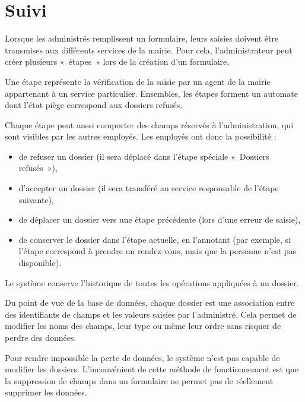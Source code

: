 \section{Suivi}\label{sec:suivi}

Lorsque les administrés remplissent un formulaire, leurs saisies doivent être transmises aux différents services de la mairie.
Pour cela, l'administrateur peut créer plusieurs «~étapes~» lors de la création d'un formulaire.

Une étape représente la vérification de la saisie par un agent de la mairie appartenant à un service particulier.
Ensembles, les étapes forment un automate dont l'état piège correspond aux dossiers refusés.

Chaque étape peut aussi comporter des champs réservés à l'administration, qui sont visibles par les autres employés.
Les employés ont donc la possibilité :
\begin{itemize}
	\item de refuser un dossier (il sera déplacé dans l'étape spéciale «~Dossiers refusés~»),
	\item d'accepter un dossier (il sera transféré au service responsable de l'étape suivante),
	\item de déplacer un dossier vers une étape précédente (lors d'une erreur de saisie),
	\item de conserver le dossier dans l'étape actuelle, en l'annotant (par exemple, si l'étape correspond à prendre un rendez-vous, mais que la personne n'est pas disponible).
\end{itemize}
Le système conserve l'historique de toutes les opérations appliquées à un dossier.

\uparagraph
Du point de vue de la base de données, chaque dossier est une association entre des identifiants de champs et les valeurs saisies par l'administré.
Cela permet de modifier les noms des champs, leur type ou même leur ordre sans risquer de perdre des données.

Pour rendre impossible la perte de données, le système n'est pas capable de modifier les dossiers.
L'inconvénient de cette méthode de fonctionnement est que la suppression de champs dans un formulaire ne permet pas de réellement supprimer les données.
